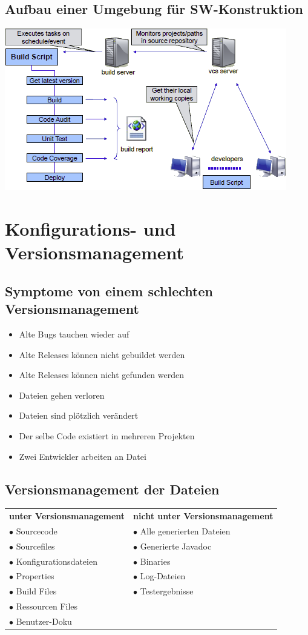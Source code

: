 \documentclass[a4paper,10pt]{article}
\newcommand{\Bold}[1]{\textbf{#1}} %
\begin{document}
\subsection{Aufbau einer Umgebung f\"ur SW-Konstruktion}
\begin{center}
 \includegraphics[scale=1.2]{umgebung_sw_konstruktion.png}
\end{center}
\pagebreak

\section{Konfigurations- und Versionsmanagement}
\subsection{Symptome von einem schlechten Versionsmanagement}
\begin{itemize}
 \item Alte Bugs tauchen wieder auf
 \item Alte Releases k\"onnen nicht gebuildet werden
 \item Alte Releases k\"onnen nicht gefunden werden
 \item Dateien gehen verloren
 \item Dateien sind pl\"otzlich ver\"andert
 \item Der selbe Code existiert in mehreren Projekten
 \item Zwei Entwickler arbeiten an Datei
\end{itemize}

\subsection{Versionsmanagement der Dateien}
\begin{tabular}{ll}
 \Bold{unter Versionsmanagement}&\Bold{nicht unter Versionsmanagement}\\
 $\bullet$ Sourcecode&$\bullet$ Alle generierten Dateien\\
 $\bullet$ Sourcefiles&$\bullet$ Generierte Javadoc\\
 $\bullet$ Konfigurationsdateien&$\bullet$ Binaries\\
 $\bullet$ Properties&$\bullet$ Log-Dateien\\
 $\bullet$ Build Files&$\bullet$ Testergebnisse\\
 $\bullet$ Ressourcen Files&\\
 $\bullet$ Benutzer-Doku&\\
\end{tabular}
\end{document}
